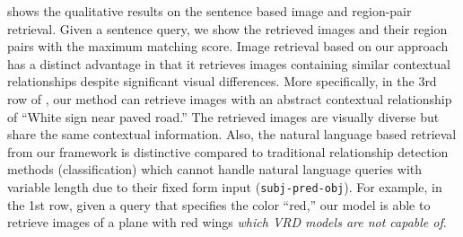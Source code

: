 \begin{table}[b]
\vspace{-2mm}
\centering
    	\vspace{1mm}
	\caption{Diversity comparison between image captioning, scene graph generation, dense captioning, and relational captioning {frameworks}.
    We measure the number of different words per image (words/img) and the number of words per bounding box (words/box).\vspace{-0mm}}
	\label{table:diversity}	
\end{table}



 shows the qualitative results on the sentence based {image and region-pair} retrieval.
Given a sentence query, we show the retrieved images and their region pairs
with
the maximum matching score.
Image retrieval based on our approach has a distinct advantage in that it retrieves images containing similar contextual relationships despite significant visual differences.
More specifically, in the 3rd row of , our method can retrieve images with an abstract contextual relationship of ``White sign near paved road.'' 
{The retrieved images} are visually diverse but share the same contextual information.
{Also, the natural language based retrieval from our framework is distinctive compared to traditional relationship detection methods (classification) which cannot handle natural language queries with variable length due to {their}
fixed form {input} (\ie\texttt{subj-pred-obj}).}
For example, in the 1st row, given a query that specifies the color ``red,'' our model is able to retrieve images of a plane with red wings \emph{which VRD models are not capable of}.










